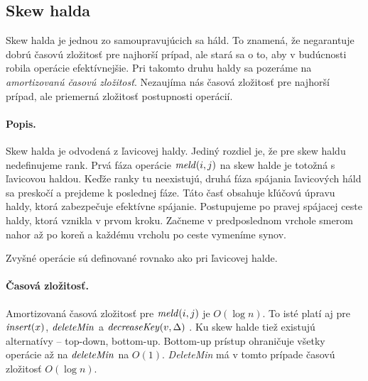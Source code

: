 \subsection{Skew halda} 
Skew halda je jednou zo samoupravujúcich sa háld. To znamená, že negarantuje dobrú časovú zložitosť pre najhorší prípad, ale stará 
sa o to, aby v budúcnosti robila operácie efektívnejšie. Pri takomto druhu haldy sa pozeráme na \emph{amortizovanú časovú 
zložitosť}. Nezaujíma nás časová zložitosť pre najhorší prípad, ale priemerná zložitosť postupnosti operácií.

\paragraph{Popis.}
Skew halda je odvodená z ľavicovej haldy. Jediný rozdiel je, že pre skew haldu nedefinujeme rank. 
Prvá fáza operácie $\mathop{\mathit{meld}}(i,j)$ na skew halde je totožná s ľavicovou haldou. Keďže ranky tu neexistujú, druhá fáza spájania 
ľavicových háld sa preskočí a prejdeme k poslednej fáze. Táto časť obsahuje kľúčovú úpravu haldy, ktorá zabezpečuje efektívne 
spájanie. Postupujeme po pravej spájacej ceste haldy, ktorá vznikla v prvom kroku. Začneme v predposlednom vrchole %
smerom nahor až po koreň a každému vrcholu po ceste vymeníme synov.


Zvyšné operácie sú definované rovnako ako pri ľavicovej halde.

\paragraph{Časová zložitosť.}
Amortizovaná časová zložitosť pre $\mathop{\mathit{meld}}(i,j)$ je $O(\log n)$.
To isté platí aj pre $\mathop{\mathit{insert}}(x)$, $\mathop{\mathit{deleteMin}}$ a $\mathop{\mathit{decreaseKey}}(v,\Delta)$ \citep{skew}.
Ku skew halde tiež existujú alternatívy -- top-down, bottom-up. 
Bottom-up prístup ohraničuje všetky operácie až na $\mathop{\mathit{deleteMin}}$ na $O(1)$.
\emph{DeleteMin} má v tomto prípade časovú zložitosť $O(\log n)$.
